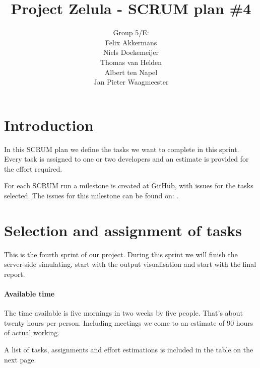\documentclass[a4paper]{article}
\title{Project Zelula - SCRUM plan \#4}
\author{Group 5/E:\\
Felix Akkermans \\
Niels Doekemeijer \\
Thomas van Helden \\
Albert ten Napel \\
Jan Pieter Waagmeester}
\begin{document}
\maketitle

\section{Introduction}
In this SCRUM plan we define the tasks we want to complete in this sprint. Every task is assigned to one or two developers and an estimate is provided for the effort required.

For each SCRUM run a milestone is created at GitHub, with issues for the tasks selected. The issues for this milestone can be found on: .

\section{Selection and assignment of tasks}
This is the fourth sprint of our project. During this sprint we will finish the server-side simulating, start with the output visualisation and start with the final report.

\paragraph{Available time}
The time available is five  mornings in two weeks by five people. That's about twenty hours per person. Including meetings we come to an estimate of 90 hours of actual working. 

A list of tasks, assignments and effort estimations is included in the table on the next page.
\end{document}
